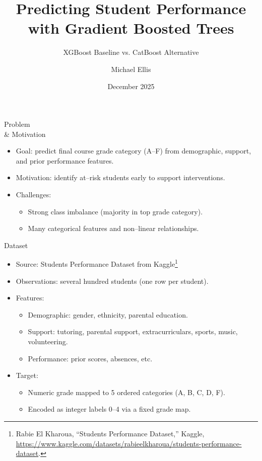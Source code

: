 \documentclass[aspectratio=169]{beamer}
\title{Predicting Student Performance with Gradient Boosted Trees}
\subtitle{XGBoost Baseline vs. CatBoost Alternative}
\author{Michael Ellis}
\institute{CPSC 4300 -- Semester Project}
\date{December 2025}
\begin{document}
\maketitle

\begin{frame}{Problem \\ \& Motivation}
  \begin{itemize}
    \item Goal: predict final course grade category (A--F) from demographic, support, and prior performance features.
    \item Motivation: identify at--risk students early to support interventions.
    \item Challenges:
    \begin{itemize}
      \item Strong class imbalance (majority in top grade category).
      \item Many categorical features and non--linear relationships.
    \end{itemize}
  \end{itemize}
\end{frame}

\begin{frame}{Dataset}
  \begin{itemize}
    \item Source: Students Performance Dataset from Kaggle\footnote{Rabie El Kharoua, ``Students Performance Dataset,'' Kaggle, \url{https://www.kaggle.com/datasets/rabieelkharoua/students-performance-dataset}.}
    \item Observations: several hundred students (one row per student).
    \item Features:
    \begin{itemize}
      \item Demographic: gender, ethnicity, parental education.
      \item Support: tutoring, parental support, extracurriculars, sports, music, volunteering.
      \item Performance: prior scores, absences, etc.
    \end{itemize}
    \item Target:
    \begin{itemize}
      \item Numeric grade mapped to 5 ordered categories (A, B, C, D, F).
      \item Encoded as integer labels 0--4 via a fixed grade map.
    \end{itemize}
  \end{itemize}
\end{frame}
\end{document}
